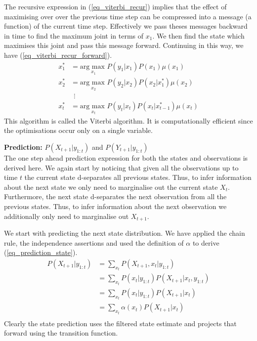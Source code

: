 \documentclass[../masters.tex]{subfiles}
\begin{document}
The recursive expression in (\ref{eq_viterbi_recur}) implies that the effect of maximising over over the previous time step can be compressed into a message (a function) of the current time step. Effectively we pass theses messages backward in time to find the maximum joint in terms of $x_1$. We then find the state which maximises this joint and pass this message forward.  Continuing in this way, we have (\ref{eq_viterbi_recur_forward}).
\begin{equation}
\begin{aligned}
x_1^* &= \underset{x_{1}}{\text{arg max }}P(y_1|x_1)P(x_1)\mu(x_1) \\
x_2^* &= \underset{x_{2}}{\text{arg max }}P(y_2|x_2)P(x_2|x_1^*)\mu(x_2) \\
&~~\vdots \\
x_t^* &= \underset{x_{t}}{\text{arg max }}P(y_t|x_t)P(x_t|x_{t-1}^*)\mu(x_t)
\end{aligned}
\label{eq_viterbi_recur_forward}
\end{equation}
This algorithm is called the Viterbi algorithm. It is computationally efficient since the optimisations occur only on a single variable.

\textbf{Prediction:} $P(X_{t+1}|y_{1:t})$ and $P(Y_{t+1}|y_{1:t})$  \\
The one step ahead prediction expression for both the states and observations is derived here. We again start by noticing that given all the observations  up to time $t$ the current state d-separates  all previous states. Thus, to infer information about the next state we only need to marginalise out the current state $X_t$. Furthermore, the next state d-separates the next observation from all the previous states. Thus, to infer information about the next observation we additionally only need to marginalise out $X_{t+1}$.

We start with predicting the next state distribution. We have applied the chain rule, the independence assertions and used the definition of $\alpha$ to derive (\ref{eq_prediction_state}).
\begin{equation}
\begin{aligned}
P(X_{t+1}|y_{1:t}) &= \sum_{x_t} P(X_{t+1}, x_t|y_{1:t}) \\
&= \sum_{x_t} P(x_t|y_{1:t})P(X_{t+1}|x_t, y_{1:t}) \\
&= \sum_{x_t} P(x_t|y_{1:t})P(X_{t+1}|x_t) \\
&= \sum_{x_t} \alpha(x_t)P(X_{t+1}|x_t) \\
\end{aligned}
\label{eq_prediction_state}
\end{equation}
Clearly the state prediction uses the filtered state estimate and projects that forward using the transition function.
\end{document}
